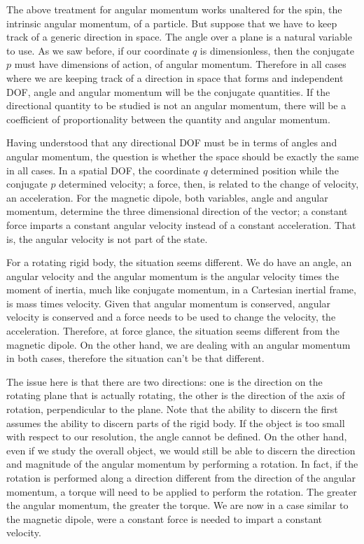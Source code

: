 The above treatment for angular momentum works unaltered for the spin, the intrinsic angular momentum, of a particle. But suppose that we have to keep track of a generic direction in space. The angle over a plane is a natural variable to use. As we saw before, if our coordinate $q$ is dimensionless, then the conjugate $p$ must have dimensions of action, of angular momentum. Therefore in all cases where we are keeping track of a direction in space that forms and independent DOF, angle and angular momentum will be the conjugate quantities. If the directional quantity to be studied is not an angular momentum, there will be a coefficient of proportionality between the quantity and angular momentum.

Having understood that any directional DOF must be in terms of angles and angular momentum, the question is whether the space should be exactly the same in all cases. In a spatial DOF, the coordinate $q$ determined position while the conjugate $p$ determined velocity; a force, then, is related to the change of velocity, an acceleration. For the magnetic dipole, both variables, angle and angular momentum, determine the three dimensional direction of the vector; a constant force imparts a constant angular velocity instead of a constant acceleration. That is, the angular velocity is not part of the state.

For a rotating rigid body, the situation seems different. We do have an angle, an angular velocity and the angular momentum is the angular velocity times the moment of inertia, much like conjugate momentum, in a Cartesian inertial frame, is mass times velocity. Given that angular momentum is conserved, angular velocity is conserved and a force needs to be used to change the velocity, the acceleration. Therefore, at force glance, the situation seems different from the magnetic dipole. On the other hand, we are dealing with an angular momentum in both cases, therefore the situation can't be that different.

The issue here is that there are two directions: one is the direction on the rotating plane that is actually rotating, the other is the direction of the axis of rotation, perpendicular to the plane. Note that the ability to discern the first assumes the ability to discern parts of the rigid body. If the object is too small with respect to our resolution, the angle cannot be defined. On the other hand, even if we study the overall object, we would still be able to discern the direction and magnitude of the angular momentum by performing a rotation. In fact, if the rotation is performed along a direction different from the direction of the angular momentum, a torque will need to be applied to perform the rotation. The greater the angular momentum, the greater the torque. We are now in a case similar to the magnetic dipole, were a constant force is needed to impart a constant velocity.

